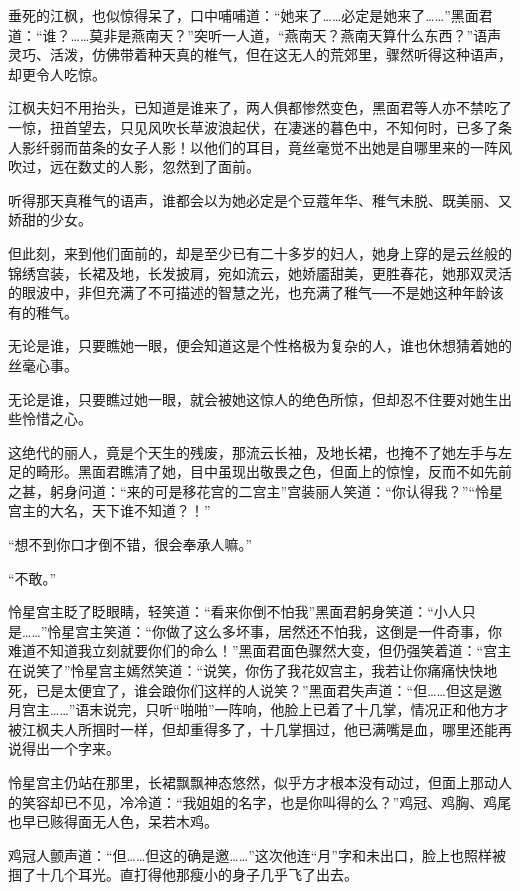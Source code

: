 \documentclass[12pt,oneside]{book}
\begin{document}
垂死的江枫，也似惊得呆了，口中哺哺道：``她来了\ldots\ldots 必定是她来了\ldots\ldots{}''黑面君道：``谁？\ldots\ldots 莫非是燕南天？''突听一人道，``燕南天？燕南天算什么东西？''语声灵巧、活泼，仿佛带着种天真的椎气，但在这无人的荒郊里，骤然听得这种语声，却更令人吃惊。

江枫夫妇不用抬头，已知道是谁来了，两人俱都惨然变色，黑面君等人亦不禁吃了一惊，扭首望去，只见风吹长草波浪起伏，在凄迷的暮色中，不知何时，已多了条人影纤弱而苗条的女子人影！以他们的耳目，竟丝毫觉不出她是自哪里来的一阵风吹过，远在数丈的人影，忽然到了面前。

听得那天真稚气的语声，谁都会以为她必定是个豆蔻年华、稚气未脱、既美丽、又娇甜的少女。

但此刻，来到他们面前的，却是至少已有二十多岁的妇人，她身上穿的是云丝般的锦绣宫装，长裙及地，长发披肩，宛如流云，她娇靥甜美，更胜春花，她那双灵活的眼波中，非但充满了不可描述的智慧之光，也充满了稚气──不是她这种年龄该有的稚气。

无论是谁，只要瞧她一眼，便会知道这是个性格极为复杂的人，谁也休想猜着她的丝毫心事。

无论是谁，只要瞧过她一眼，就会被她这惊人的绝色所惊，但却忍不住要对她生出些怜惜之心。

这绝代的丽人，竟是个天生的残废，那流云长袖，及地长裙，也掩不了她左手与左足的畸形。黑面君瞧清了她，目中虽现出敬畏之色，但面上的惊惶，反而不如先前之甚，躬身问道：``来的可是移花宫的二宫主''宫装丽人笑道：``你认得我？''``怜星宫主的大名，天下谁不知道？！''

``想不到你口才倒不错，很会奉承人嘛。''

``不敢。''

怜星宫主眨了眨眼睛，轻笑道：``看来你倒不怕我''黑面君躬身笑道：``小人只是\ldots\ldots{}''怜星宫主笑道：``你做了这么多坏事，居然还不怕我，这倒是一件奇事，你难道不知道我立刻就要你们的命么！''黑面君面色骤然大变，但仍强笑着道：``宫主在说笑了''怜星宫主嫣然笑道：``说笑，你伤了我花奴宫主，我若让你痛痛快快地死，已是太便宜了，谁会踉你们这样的人说笑？''黑面君失声道：``但\ldots\ldots 但这是邀月宫主\ldots\ldots{}''语末说完，只听``啪啪''一阵响，他脸上已着了十几掌，情况正和他方才被江枫夫人所掴时一样，但却重得多了，十几掌掴过，他已满嘴是血，哪里还能再说得出一个字来。

怜星宫主仍站在那里，长裙飘飘神态悠然，似乎方才根本没有动过，但面上那动人的笑容却已不见，冷冷道：``我姐姐的名字，也是你叫得的么？''鸡冠、鸡胸、鸡尾也早已赅得面无人色，呆若木鸡。

鸡冠人颤声道：``但\ldots\ldots 但这的确是邀\ldots\ldots{}''这次他连``月''字和未出口，脸上也照样被掴了十几个耳光。直打得他那瘦小的身子几乎飞了出去。
\end{document}

